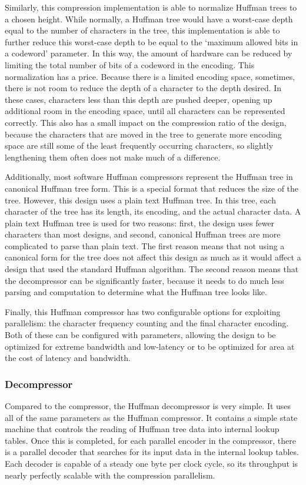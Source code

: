 \documentclass[doublespace,nopageskip]{VTthesis}
\begin{document}
Similarly, this compression implementation is able to normalize Huffman trees to a chosen height. While normally, a Huffman tree would have a worst-case depth equal to the number of characters in the tree, this implementation is able to further reduce this worst-case depth to be equal to the `maximum allowed bits in a codeword' parameter. In this way, the amount of hardware can be reduced by limiting the total number of bits of a codeword in the encoding. This normalization has a price. Because there is a limited encoding space, sometimes, there is not room to reduce the depth of a character to the depth desired. In these cases, characters less than this depth are pushed deeper, opening up additional room in the encoding space, until all characters can be represented correctly. This also has a small impact on the compression ratio of the design, because the characters that are moved in the tree to generate more encoding space are still some of the least frequently occurring characters, so slightly lengthening them often does not make much of a difference.

Additionally, most software Huffman compressors represent the Huffman tree in canonical Huffman tree form. This is a special format that reduces the size of the tree. However, this design uses a plain text Huffman tree. In this tree, each character of the tree has its length, its encoding, and the actual character data. A plain text Huffman tree is used for two reasons: first, the design uses fewer characters than most designs, and second, canonical Huffman trees are more complicated to parse than plain text. The first reason means that not using a canonical form for the tree does not affect this design as much as it would affect a design that used the standard Huffman algorithm. The second reason means that the decompressor can be significantly faster, because it needs to do much less parsing and computation to determine what the Huffman tree looks like. 

Finally, this Huffman compressor has two configurable options for exploiting parallelism: the character frequency counting and the final character encoding. Both of these can be configured with parameters, allowing the design to be optimized for extreme bandwidth and low-latency or to be optimized for area at the cost of latency and bandwidth.

\subsubsection{Decompressor}\label{sss:huffman_decompressor_design}
Compared to the compressor, the Huffman decompressor is very simple. It uses all of the same parameters as the Huffman compressor. It contains a simple state machine that controls the reading of Huffman tree data into internal lookup tables. Once this is completed, for each parallel encoder in the compressor, there is a parallel decoder that searches for its input data in the internal lookup tables. Each decoder is capable of a steady one byte per clock cycle, so its throughput is nearly perfectly scalable with the compression parallelism.
\end{document}
